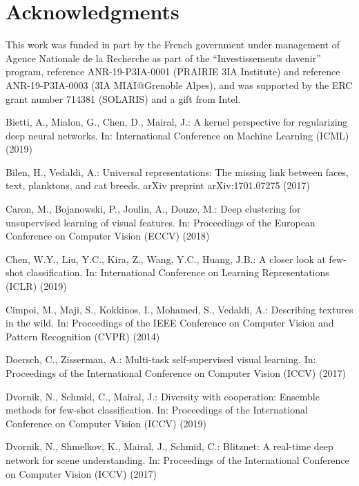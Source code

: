 \documentclass[runningheads]{llncs}
\begin{document}
 
\section{Acknowledgments}
This work was funded in part by the French government under management
of Agence Nationale de la Recherche as part of the ``Investissements davenir''
program, reference ANR-19-P3IA-0001 (PRAIRIE 3IA Institute) and reference
ANR-19-P3IA-0003 (3IA MIAI@Grenoble Alpes), and was supported by the ERC grant
number 714381 (SOLARIS) and a gift from Intel.


\begin{thebibliography}{10}
\providecommand{\url}[1]{\texttt{#1}}
\providecommand{\urlprefix}{URL }
\providecommand{\doi}[1]{https://doi.org/#1}

Bietti, A., Mialon, G., Chen, D., Mairal, J.: A kernel perspective for
  regularizing deep neural networks. In: International Conference on Machine
  Learning (ICML) (2019)

Bilen, H., Vedaldi, A.: Universal representations: The missing link between
  faces, text, planktons, and cat breeds. arXiv preprint arXiv:1701.07275
  (2017)

Caron, M., Bojanowski, P., Joulin, A., Douze, M.: Deep clustering for
  unsupervised learning of visual features. In: Proceedings of the European
  Conference on Computer Vision (ECCV) (2018)

Chen, W.Y., Liu, Y.C., Kira, Z., Wang, Y.C., Huang, J.B.: A closer look at
  few-shot classification. In: International Conference on Learning
  Representations (ICLR) (2019)

Cimpoi, M., Maji, S., Kokkinos, I., Mohamed, S., Vedaldi, A.: Describing
  textures in the wild. In: Proceedings of the IEEE Conference on Computer
  Vision and Pattern Recognition (CVPR) (2014)

Doersch, C., Zisserman, A.: Multi-task self-supervised visual learning. In:
  Proceedings of the International Conference on Computer Vision (ICCV) (2017)

Dvornik, N., Schmid, C., Mairal, J.: Diversity with cooperation: Ensemble
  methods for few-shot classification. In: Proceedings of the International
  Conference on Computer Vision (ICCV) (2019)

Dvornik, N., Shmelkov, K., Mairal, J., Schmid, C.: Blitznet: A real-time deep
  network for scene understanding. In: Proceedings of the International
  Conference on Computer Vision (ICCV) (2017)


\end{thebibliography}
\end{document}
